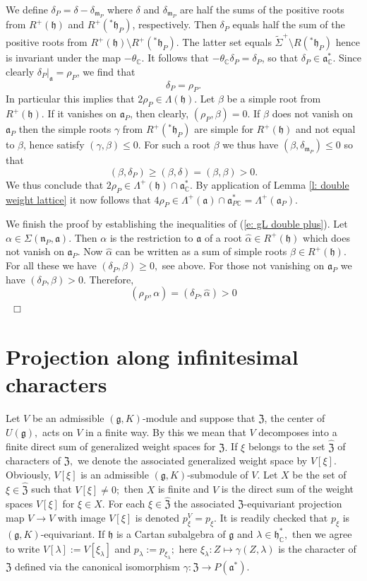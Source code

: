 \documentclass[12pt,a4paper]{article}
\def\qed{~\hfill\hbox{$\Box$}\medbreak}
\def\msy#1{{\mathbb #1}}
\def\C{{\msy C}}
\def\ga{\alpha}
\def\gb{\beta}
\def\gd{\delta}
\def\gg{\gamma}
\def\gl{\lambda}
\def\gS{\Sigma}
\def\got#1{\mathfrak #1}
\def\fa{{\got a}}
\def\fg{{\got g}}
\def\fh{{\got h}}
\def\fm{{\got m}}
\def\fn{{\got n}}
\def\to{\rightarrow}
\def\iC{{\scriptscriptstyle \C}}
\numberwithin{Thm}{section}
\numberwithin{equation}{section}
\def\fZ{{\mathfrak Z}}
\def\fadc{\fa_\C^*}
\def\faPdc{{\fa_{P\iC}^*}}
\def\gL{\Lambda}
\def\fhdc{\fh_\iC^*}
\def\Cartan{\theta}
\numberwithin{equation}{section}
\def\fad{{\fa^*}}
\def\fZ{{\mathfrak Z}}
\def\gL{\Lambda}
\def\fhdc{\fh_\iC^*}
\def\faPdc{\fa_{P\iC}^*}
\def\fh{{\mathfrak h}}
\def\Cartan{\theta}
\def\Rinp#1#2{(#1,#2)}
\begin{document}
We define  $\gd_P = \gd - \gd_{\fm_P}$ where $\gd$ and $\gd_{\fm_P}$ are half the sums 
of the positive roots from $R^+(\fh)$ and $R^+({}^*\fh_P)$, respectively. 
Then $\gd_P$ equals half the sum of the positive roots from $R^+(\fh)\setminus R^+({}^*\fh_P).$ 
The latter set equals $\widetilde \gS^+\setminus R({}^*\fh_P)$ hence is invariant under the map $-\Cartan_{\iC}.$ 
It follows that $- \Cartan_\iC \gd_P = \gd_P$, so that $\gd_P \in \fadc.$ Since clearly $\gd_P|_{\fa} = \rho_P$, 
we find that 
$$ 
\gd_P = \rho_P.
$$ 
In particular this implies that $2 \rho_P \in \gL(\fh).$ 
Let $\gb$ be a simple root from $ R^+(\fh).$ 
If it vanishes on $\fa_P$, then clearly, $\Rinp{\rho_P}{\gb} = 0.$ If $\gb$ does not vanish 
on $\fa_P$ then the simple roots $\gg$ from $R^+({}^*\fh_P)$ are simple  for $R^+(\fh)$ 
and not equal to $\gb$, hence satisfy $\Rinp{\gg}{\gb} \leq 0.$ For such a root $\gb$ we thus have 
$\Rinp{\gb}{\gd_{\fm_P}} \leq 0$ so that 
$$ 
\Rinp{\gb}{\gd_P} \geq \Rinp{\gb}{\gd}  = \Rinp{\gb}{\gb} > 0.
$$ 
We thus conclude that $2\rho_P \in \gL^+(\fh) \cap \fadc.$ 
By application of Lemma \ref{l: double weight lattice} it now follows that $4\rho_P \in \gL^+(\fa) \cap \faPdc = \gL^+(\fa_P).$ 

We finish the proof by establishing the inequalities of (\ref{e: gL double plus}). 
Let $\ga \in \gS(\fn_P, \fa).$ 
Then $\ga$ is the restriction to $\fa$ of a root $\hat\ga \in R^+(\fh)$ which does not 
vanish on $\fa_P.$ Now $\hat \ga$ can be written as a sum of simple roots $\gb \in R^+(\fh).$ 
For all these we have $\Rinp{\gd_P}{\gb} \geq 0,$ see above. For those not vanishing on $\fa_P$ 
we have $\Rinp{\gd_P}{\gb} >0.$ Therefore,
$$ 
\Rinp{\rho_P}{\ga} = \Rinp{\gd_P}{\hat \ga} > 0
$$ 
\qed

%

\section{Projection along infinitesimal characters}
\label{s: proj inf char}
% 
Let  $V$ be an admissible $(\fg, K)$-module and suppose that 
$\fZ$, the center of $U(\fg),$ acts on $V$ in a finite way. By this we mean that
$V$ decomposes into a finite direct sum of generalized weight spaces for $\fZ.$ 
If $\xi$ belongs to the set $\widehat \fZ$ of characters of $\fZ,$ we denote the associated
generalized weight space by $V[\xi].$ Obviously, $V[\xi]$ is an admissible
$(\fg, K)$-submodule of $V.$ Let $X$ be the set of $\xi \in \widehat\fZ$ such that
$V[\xi] \neq 0;$ then $X$ is finite and $V$ is the direct sum of the weight spaces
$V[\xi]$ for $\xi \in X.$ For each $\xi \in \widehat \fZ$ the associated $\fZ$-equivariant
projection map $V \to V$ with image $V[\xi]$ is denoted $p^V_\xi = p_\xi.$ It is readily checked
that $p_\xi$ is $(\fg, K)$-equivariant. If $\fh$ is a Cartan subalgebra of $\fg$ and
$\gl \in \fhdc,$ then we agree to write $V[\gl]:= V[ \xi_\gl]$ and $p_\gl := p_{\xi_\gl};$ 
here $\xi_\gl: Z \mapsto \gg(Z, \gl)$ is the character of $\fZ$ defined via the canonical
isomorphism $\gg: \fZ \to P(\fad).$ 
\end{document}
